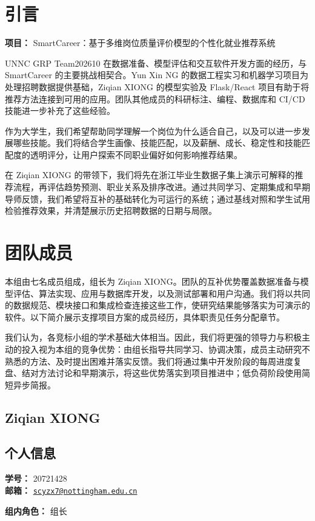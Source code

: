 \documentclass[a4paper,12pt]{article}
\title{\BidTitle}
\author{\BidTeam}
\date{\BidDate}
\newcommand{\PersonalInformation}[2]{%
  \subsection*{个人信息}
  \if\relax\detokenize{#1}\relax\else
  \noindent\textbf{学号：} #1\\
  \fi
  \textbf{邮箱：} #2\par
}
\newcommand{\BidProjectName}{SmartCareer：基于多维岗位质量评价模型的个性化就业推荐系统}
\begin{document}
\maketitle
\thispagestyle{plain}
\tableofcontents
\newpage

\section{引言}
\noindent\textbf{项目：} \BidProjectName
\par\medskip
UNNC GRP Team202610 在数据准备、模型评估和交互软件开发方面的经历，与 SmartCareer 的主要挑战相契合。Yun Xin NG 的数据工程实习和机器学习项目为处理招聘数据提供基础，Ziqian XIONG 的模型实验及 Flask/React 项目有助于将推荐方法连接到可用的应用。团队其他成员的科研标注、编程、数据库和 CI/CD 技能进一步补充了这些经验。

作为大学生，我们希望帮助同学理解一个岗位为什么适合自己，以及可以进一步发展哪些技能。我们将结合学生画像、技能匹配，以及薪酬、成长、稳定性和技能匹配度的透明评分，让用户探索不同职业偏好如何影响推荐结果。

在 Ziqian XIONG 的带领下，我们将先在浙江毕业生数据子集上演示可解释的推荐流程，再评估趋势预测、职业关系及排序改进。通过共同学习、定期集成和早期导师反馈，我们希望将互补的基础转化为可运行的系统；通过基线对照和学生试用检验推荐效果，并清楚展示历史招聘数据的日期与局限。

\newpage
\section{团队成员}
本组由七名成员组成，组长为 Ziqian XIONG。团队的互补优势覆盖数据准备与模型评估、算法实现、应用与数据库开发，以及测试部署和用户沟通。我们将以共同的数据规范、模块接口和集成检查连接这些工作，使研究结果能够落实为可演示的软件。以下简介展示支撑项目方案的成员经历，具体职责见任务分配章节。

我们认为，各竞标小组的学术基础大体相当。因此，我们将更强的领导力与积极主动的投入视为本组的竞争优势：由组长指导共同学习、协调决策，成员主动研究不熟悉的方法、及时提出困难并落实反馈。我们将通过集中开发阶段的每周进度复盘、结对方法讨论和早期演示，将这些优势落实到项目推进中；低负荷阶段使用简短异步简报。

\subsection{Ziqian XIONG}
\PersonalInformation{20721428}{\href{mailto:scyzx7@nottingham.edu.cn}{\nolinkurl{scyzx7@nottingham.edu.cn}}}
\noindent\textbf{组内角色：} 组长\par
\end{document}
